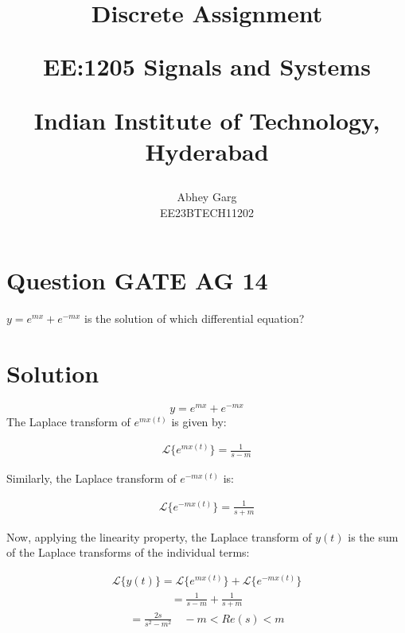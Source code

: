 \documentclass[journal,12pt,twocolumn]{IEEEtran}
\theoremstyle{remark}
\begin{document}
%




\vspace{3cm}

\title{
Discrete Assignment 

\large{EE:1205 Signals and Systems}

Indian Institute of Technology, Hyderabad
}
\author{Abhey Garg

EE23BTECH11202
}	


\maketitle

\newpage


\bigskip

\renewcommand{\thefigure}{\arabic{figure}}
\renewcommand{\thetable}{\arabic{table}}
\renewcommand{\theequation}{\arabic{equation}}

\section{Question GATE AG 14}
$y=e^{mx}+e^{-mx}$ is the solution of which differential equation?
\section{Solution}

\begin{equation}
y = e^{mx} + e^{-mx} \label{eq:eq1}
\end{equation}
The Laplace transform of $e^{mx(t)}$ is given by:

\begin{align}
\mathcal{L}\{e^{mx(t)}\} = \frac{1}{s - m}
\end{align}  

Similarly, the Laplace transform of $e^{-mx(t)}$ is:

\begin{align}
\mathcal{L}\{e^{-mx(t)}\} = \frac{1}{s + m}
\end{align}
  
Now, applying the linearity property, the Laplace transform of $y(t)$ is the sum of the Laplace transforms of the individual terms:

\begin{align}
\mathcal{L}\{y(t)\} = \mathcal{L}\{e^{mx(t)}\} + \mathcal{L}\{e^{-mx(t)}\} 
\end{align} 
\begin{align}
= \frac{1}{s - m} + \frac{1}{s + m} 
\end{align}
\begin{align}
= \frac{2s}{s^2 - m^2} \quad -m < Re(s) < m
\end{align}
\end{document}
